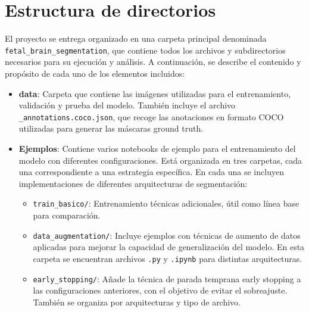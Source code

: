 
\section{Estructura de directorios}

El proyecto se entrega organizado en una carpeta principal denominada \texttt{fetal\_brain\_segmentation}, que contiene todos los archivos y subdirectorios necesarios para su ejecución y análisis. A continuación, se describe el contenido y propósito de cada uno de los elementos incluidos:

\begin{itemize}
    \item \textbf{data}: Carpeta que contiene las imágenes utilizadas para el entrenamiento, validación y prueba del modelo. También incluye el archivo \texttt{\_annotations.coco.json}, que recoge las anotaciones en formato COCO utilizadas para generar las máscaras ground truth.
    \item \textbf{Ejemplos}: Contiene varios notebooks de ejemplo para el entrenamiento del modelo con diferentes configuraciones. Está organizada en tres carpetas, cada una correspondiente a una estrategia específica. En cada una se incluyen implementaciones de diferentes arquitecturas de segmentación:
    \begin{itemize}
        \item \texttt{train\_basico/}: Entrenamiento técnicas adicionales, útil como línea base para comparación.
        \item \texttt{data\_augmentation/}: Incluye ejemplos con técnicas de aumento de datos aplicadas para mejorar la capacidad de generalización del modelo. En esta carpeta se encuentran archivos \texttt{.py} y \texttt{.ipynb} para distintas arquitecturas.
        \item \texttt{early\_stopping/}: Añade la técnica de parada temprana early stopping a las configuraciones anteriores, con el objetivo de evitar el sobreajuste. También se organiza por arquitecturas y tipo de archivo.


\end{itemize}
\end{itemize}
